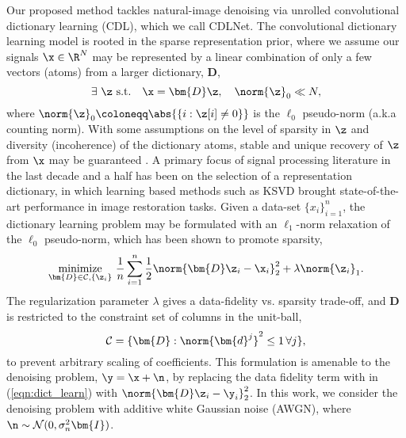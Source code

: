 \documentclass[conference]{IEEEtran}
\newcommand{\soa}{state-of-the-art }
\begin{document}
Our proposed method tackles natural-image denoising via unrolled convolutional dictionary learning (CDL), which we call CDLNet. The convolutional dictionary learning model is rooted in the sparse representation prior, where we assume our signals $\x \in \R^N$ may be represented by a linear combination of only a few vectors (atoms) from a larger dictionary, $\bm{D}$,
\begin{equation} \label{eqn:sparse_rep}
\exists ~ \z ~ \mathrm{s.t.} \quad \x = \bm{D}\z, \quad \norm{\z}_0 \ll N,
\end{equation}
where $\norm{\z}_0 \coloneqq \abs{\{i : \z[i] \neq 0 \}}$ is the $\ell_0$ pseudo-norm (a.k.a counting norm). With some assumptions on the level of sparsity in $\z$ and diversity (incoherence) of the dictionary atoms, stable and unique recovery of $\z$ from $\x$ may be guaranteed \cite{Mallat}. A primary focus of signal processing literature in the last decade and a half has been on the selection of a representation dictionary, in which learning based methods such as KSVD \cite{KSVD} brought \soa performance in image restoration tasks. Given a data-set $\{x_i\}_{i=1}^n$, the dictionary learning problem may be formulated with an $\ell_1$-norm relaxation of the $\ell_0$ pseudo-norm, which has been shown to promote sparsity,
\begin{equation} \label{eqn:dict_learn}
\underset{\bm{D}\in \mathcal{C}, \{\z_i\}}{\mathrm{minimize}} ~ \frac{1}{n} \sum_{i=1}^n \frac{1}{2}\norm{\bm{D}\z_i -
\x_i}_2^2 + \lambda \norm{\z_i}_1.
\end{equation}
The regularization parameter $\lambda$ gives a data-fidelity vs. sparsity trade-off, and $\bm{D}$ is restricted to the constraint set of columns in the unit-ball,
\begin{equation} \label{eqn:constraint}
\mathcal{C} = \{\bm{D} : \norm{\bm{d}^j}^2 \leq 1 \, \forall j\},
\end{equation}
to prevent arbitrary scaling of coefficients.
This formulation is amenable to the denoising problem, $\y = \x + \n$, by replacing the data fidelity term with in (\ref{eqn:dict_learn}) with $\norm{\bm{D}\z_i - \y_i}_2^2$. In this work, we consider the denoising problem with additive white Gaussian noise
(AWGN), where $\n \sim \mathcal{N}(0,\sigma_n^2\bm{I})$.
\end{document}
